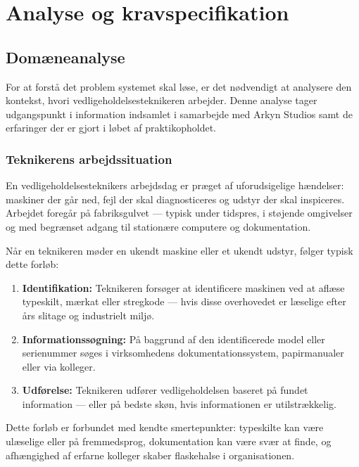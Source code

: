 \chapter{Analyse og kravspecifikation}
\label{chap:analysis}

\section{Domæneanalyse}
\label{sec:domæneanalyse}

For at forstå det problem systemet skal løse, er det nødvendigt at analysere den kontekst, hvori vedligeholdelsesteknikeren arbejder. Denne analyse tager udgangspunkt i information indsamlet i samarbejde med Arkyn Studios samt de erfaringer der er gjort i løbet af praktikopholdet.

\subsection{Teknikerens arbejdssituation}
\label{subsec:teknikerens-arbejdssituation}

En vedligeholdelsesteknikers arbejdsdag er præget af uforudsigelige hændelser: maskiner der går ned, fejl der skal diagnosticeres og udstyr der skal inspiceres. Arbejdet foregår på fabriksgulvet — typisk under tidspres, i støjende omgivelser og med begrænset adgang til stationære computere og dokumentation.

Når en teknikeren møder en ukendt maskine eller et ukendt udstyr, følger typisk dette forløb:

\begin{enumerate}
  \item \textbf{Identifikation:} Teknikeren forsøger at identificere maskinen ved at aflæse typeskilt, mærkat eller stregkode — hvis disse overhovedet er læselige efter års slitage og industrielt miljø.
  \item \textbf{Informationssøgning:} På baggrund af den identificerede model eller serienummer søges i virksomhedens dokumentationssystem, papirmanualer eller via kolleger.
  \item \textbf{Udførelse:} Teknikeren udfører vedligeholdelsen baseret på fundet information — eller på bedste skøn, hvis informationen er utilstrækkelig.
\end{enumerate}

Dette forløb er forbundet med kendte smertepunkter: typeskilte kan være ulæselige eller på fremmedsprog, dokumentation kan være svær at finde, og afhængighed af erfarne kolleger skaber flaskehalse i organisationen.

